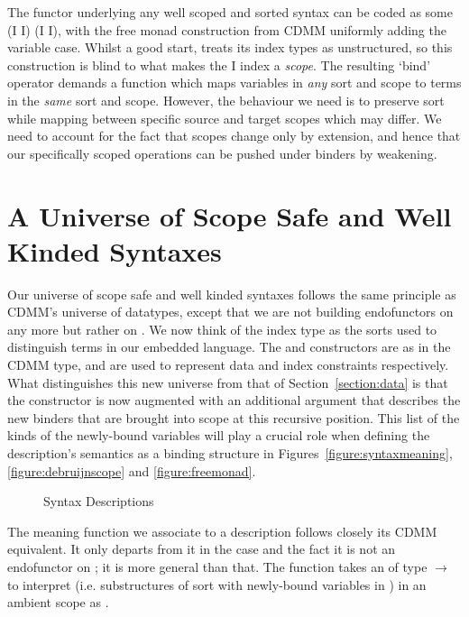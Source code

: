 The functor underlying any well scoped and sorted syntax can be coded as some
{ (I \AR{$\times$}  I) (I \AR{$\times$}  I)}, with the
free monad construction from CDMM uniformly adding the variable case. Whilst a
good start,  treats its index types as unstructured, so this construction
is blind to what makes the { I} index a \emph{scope}. The resulting
`bind' operator demands a function which maps variables in \emph{any} sort and
scope to terms in the \emph{same} sort and scope. However, the behaviour we need
is to preserve sort while mapping between specific source and target scopes which
may differ. We need to account for the fact that scopes change only by extension,
and hence that our specifically scoped operations can be pushed under binders by
weakening.




\section{A Universe of Scope Safe and Well Kinded Syntaxes}\label{section:universe}

Our universe of scope safe and well kinded syntaxes follows the same principle
as CDMM's universe of datatypes, except that we are not building endofunctors on
 any more but rather on { }. We now think of the index
type  as the sorts
used to distinguish terms in our embedded language. The  and
 constructors are as in the CDMM  type, and are used to
represent data and index constraints respectively.
What distinguishes this new universe  from that of Section~\ref{section:data}
is that the
 constructor
is now augmented with an additional { } argument that describes
the new binders that are brought into scope at this recursive position. This
list of the kinds of the newly-bound variables will play a crucial role when
defining the description's semantics as a binding structure in
Figures~\ref{figure:syntaxmeaning}, \ref{figure:debruijnscope} and \ref{figure:freemonad}.

\begin{figure}[h]
\caption{Syntax Descriptions}
\end{figure}

The meaning function  we associate to a description follows closely
its CDMM equivalent. It only departs from it in the  case and the fact
it is not an endofunctor on  ; it is more general than that.
The function takes an  of type {  $\rightarrow$  }
to interpret {  } (i.e. substructures of sort  with
newly-bound variables in ) in an ambient scope  as {   }.

